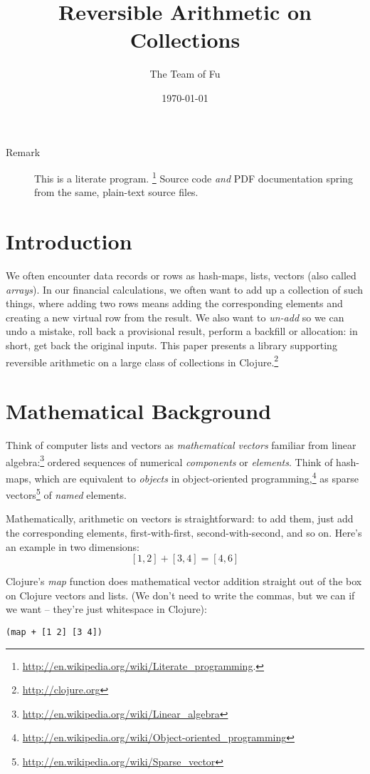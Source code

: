 \documentclass[11pt]{article}
\author{The Team of Fu}
\date{\today}
\title{Reversible Arithmetic on Collections}
\begin{document}
\maketitle
\tableofcontents


\begin{description}
\item[{Remark}] This is a literate program.
\footnote{\url{http://en.wikipedia.org/wiki/Literate_programming}.}
Source code \emph{and} PDF documentation spring
from the same, plain-text source files.
\end{description}

\section{Introduction}
\label{sec-1}

We often encounter data records or rows as hash-maps, lists, vectors
(also called \emph{arrays}). In our financial calculations, we often want
to add up a collection of such things, where adding two rows means
adding the corresponding elements and creating a new virtual row from
the result. We also want to \emph{un-add} so we can undo a mistake, roll
back a provisional result, perform a backfill or allocation: in short,
get back the original inputs. This paper presents a library supporting
reversible arithmetic on a large class of collections in
Clojure.\footnote{\url{http://clojure.org}}
\section{Mathematical Background}
\label{sec-2}

Think of computer lists and vectors as \emph{mathematical vectors} familiar
from linear algebra:\footnote{\url{http://en.wikipedia.org/wiki/Linear_algebra}}
ordered sequences of numerical \emph{components} or \emph{elements}. Think of
hash-maps, which are equivalent to \emph{objects} in object-oriented
programming,\footnote{\url{http://en.wikipedia.org/wiki/Object-oriented_programming}}
as sparse vectors\footnote{\url{http://en.wikipedia.org/wiki/Sparse_vector}} of
\emph{named} elements.

Mathematically, arithmetic on vectors is straightforward: to add
them, just add the corresponding elements, first-with-first,
second-with-second, and so on.  Here's an example in two dimensions:
$$[1, 2] + [3, 4] = [4, 6]$$

Clojure's \emph{map} function does mathematical vector addition straight
out of the box on Clojure vectors and lists.  (We don't need to write
the commas, but we can if we want -- they're just whitespace in
Clojure):
\begin{verbatim}
(map + [1 2] [3 4])
\end{verbatim}
\end{document}
